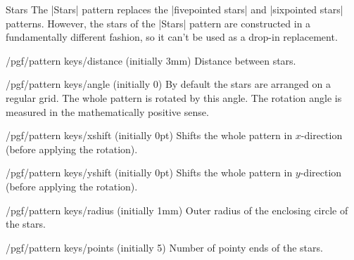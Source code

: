 \begin{pattern}{Stars}
    The |Stars| pattern replaces the |fivepointed stars| and |sixpointed stars|
    patterns. However, the stars of the |Stars| pattern are constructed in a
    fundamentally different fashion, so it can't be used as a drop-in
    replacement.
    \begin{key}{/pgf/pattern keys/distance (initially 3mm)}
        Distance between stars.
    \end{key}
    \begin{key}{/pgf/pattern keys/angle (initially 0)}
        By default the stars are arranged on a regular grid. The whole pattern
        is rotated by this angle. The rotation angle is measured in the
        mathematically positive sense.
    \end{key}
    \begin{key}{/pgf/pattern keys/xshift (initially 0pt)}
        Shifts the whole pattern in $x$-direction (before applying the
        rotation).
    \end{key}
    \begin{key}{/pgf/pattern keys/yshift (initially 0pt)}
        Shifts the whole pattern in $y$-direction (before applying the
        rotation).
    \end{key}
    \begin{key}{/pgf/pattern keys/radius (initially 1mm)}
        Outer radius of the enclosing circle of the stars.
    \end{key}
    \begin{key}{/pgf/pattern keys/points (initially 5)}
        Number of pointy ends of the stars.
    \end{key}
\begin{codeexample}[preamble={\usetikzlibrary{patterns.meta}}]
\end{codeexample}
\end{pattern}


